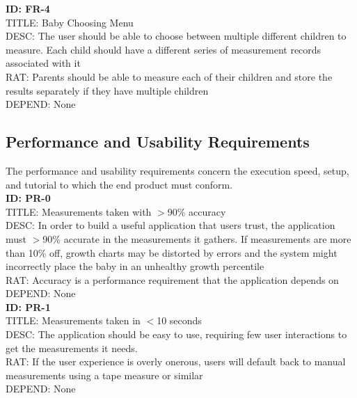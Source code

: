 \documentclass[letterpaper,10pt,draftclsnofoot,onecolumn,compsoc]{IEEEtran}
\begin{document}
\begin{singlespace}
\textbf{ID: FR-4}\\
TITLE: Baby Choosing Menu\\
DESC: The user should be able to choose between multiple different children to measure. Each child should have a different series of measurement records associated with it\\
RAT: Parents should be able to measure each of their children and store the results separately if they have multiple children\\
DEPEND: None\\
\end{singlespace}

\subsection{Performance and Usability Requirements}
\begin{singlespace}
\noindent
The performance and usability requirements concern the execution speed, setup, and tutorial  to which the end product must conform.\\

\textbf{ID: PR-0}\\
TITLE: Measurements taken with $>$90\% accuracy\\
DESC: In order to build a useful application that users trust, the application must $>$90\% accurate in the measurements it gathers. If measurements are more than 10\% off, growth charts may be distorted by errors and the system might incorrectly place the baby in an unhealthy growth percentile\\
RAT: Accuracy is a performance requirement that the application depends on\\
DEPEND: None\\

\textbf{ID: PR-1}\\
TITLE: Measurements taken in $<$10 seconds\\
DESC: The application should be easy to use, requiring few user interactions to get the measurements it needs.\\
RAT: If the user experience is overly onerous, users will default back to manual measurements using a tape measure or similar\\
DEPEND: None\\


\end{singlespace}
\end{document}
